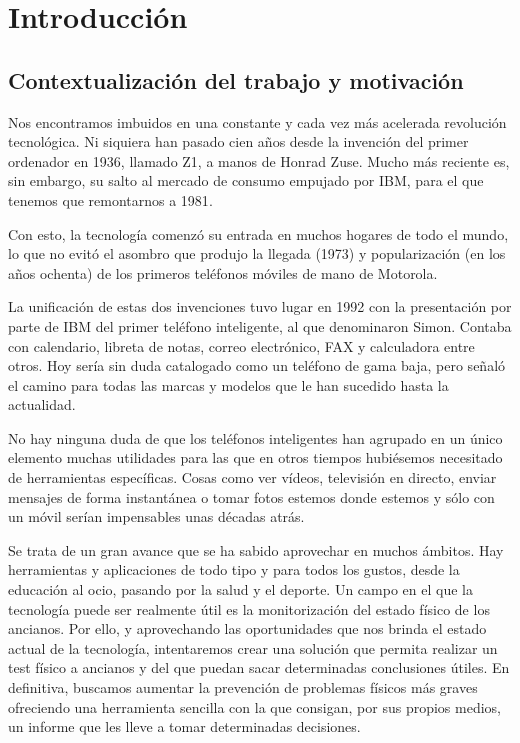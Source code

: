 \chapter{Introducción}

\section{Contextualización del trabajo y motivación}

Nos encontramos imbuidos en una constante y cada vez más acelerada revolución tecnológica. Ni siquiera han pasado cien años desde la invención del primer ordenador en 1936, llamado Z1, a manos de Honrad Zuse. Mucho más reciente es, sin embargo, su salto al mercado de consumo empujado por IBM, para el que tenemos que remontarnos a 1981\cite{primer_ordenador}. 

Con esto, la tecnología comenzó su entrada en muchos hogares de todo el mundo, lo que no evitó el asombro que produjo la llegada (1973) y popularización (en los años ochenta) de los primeros teléfonos móviles de mano de Motorola\cite{primer_movil}.

La unificación de estas dos invenciones tuvo lugar en 1992 con la presentación por parte de IBM del primer teléfono inteligente, al que denominaron Simon\cite{smartphone}. Contaba con calendario, libreta de notas, correo electrónico, FAX y calculadora entre otros. Hoy sería sin duda catalogado como un teléfono de gama baja, pero señaló el camino para todas las marcas y modelos que le han sucedido hasta la actualidad.

No hay ninguna duda de que los teléfonos inteligentes han agrupado en un único elemento muchas utilidades para las que en otros tiempos hubiésemos necesitado de herramientas específicas. Cosas como ver vídeos, televisión en directo, enviar mensajes de forma instantánea o tomar fotos estemos donde estemos y sólo con un móvil serían impensables unas décadas atrás. 

Se trata de un gran avance que se ha sabido aprovechar en muchos ámbitos. Hay herramientas y aplicaciones de todo tipo y para todos los gustos, desde la educación al ocio, pasando por la salud y el deporte. Un campo en el que la tecnología puede ser realmente útil es la monitorización del estado físico de los ancianos. Por ello, y aprovechando las oportunidades que nos brinda el estado actual de la tecnología, intentaremos crear una solución que permita realizar un test físico a ancianos y del que puedan sacar determinadas conclusiones útiles. En definitiva, buscamos aumentar la prevención de problemas físicos más graves ofreciendo una herramienta sencilla con la que consigan, por sus propios medios, un informe que les lleve a tomar determinadas decisiones. 

